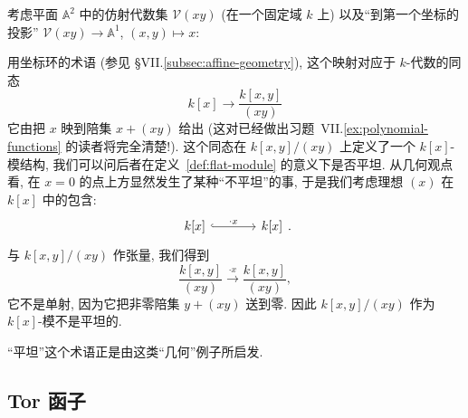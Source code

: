 \begin{example}\label{ex:flat-geometric}
考虑平面 $\mathbb{A}^2$ 中的仿射代数集 $\mathcal{V}(xy)$ (在一个固定域 $k$ 上) 以及``到第一个坐标的投影'' $\mathcal{V}(xy)\to\mathbb{A}^1$, $(x,y)\mapsto x$:
\begin{center}
\end{center}
用坐标环的术语 (参见 §VII.\ref{subsec:affine-geometry}), 这个映射对应于 $k$-代数的同态
\[
k[x]\to\frac{k[x,y]}{(xy)}
\]
它由把 $x$ 映到陪集 $x+(xy)$ 给出 (这对已经做出习题~VII.\ref{ex:polynomial-functions} 的读者将完全清楚!). 这个同态在 $k[x,y]/(xy)$ 上定义了一个 $k[x]$-模结构, 我们可以问后者在定义~\ref{def:flat-module} 的意义下是否平坦. 从几何观点看, 在 $x=0$ 的点上方显然发生了某种``不平坦''的事, 于是我们考虑理想 $(x)$ 在 $k[x]$ 中的包含:
\[
\begin{tikzcd}[column sep=large]k[x] \ar[r,hook,"\cdot x"] & k[x]\end{tikzcd}.
\]
与 $k[x,y]/(xy)$ 作张量, 我们得到
\[
\frac{k[x,y]}{(xy)}\xrightarrow{\cdot x}\frac{k[x,y]}{(xy)},
\]
它不是单射, 因为它把非零陪集 $y+(xy)$ 送到零. 因此 $k[x,y]/(xy)$ 作为 $k[x]$-模不是平坦的.

``平坦''这个术语正是由这类``几何''例子所启发.
\end{example}

\subsection{Tor 函子}
\label{subsec:tor-functors}

